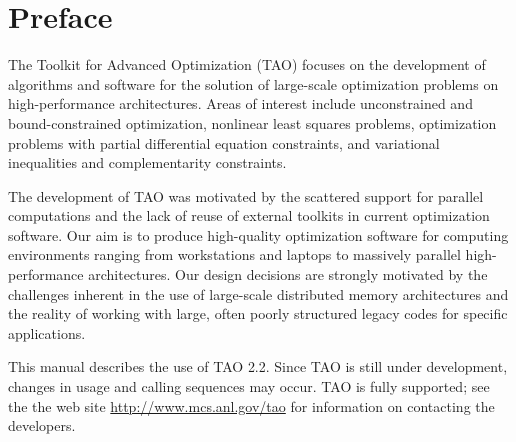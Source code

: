 
\section*{Preface}

The Toolkit for Advanced Optimization (TAO) focuses on the development
of algorithms and software for the solution of large-scale optimization 
problems on high-performance architectures.  Areas of interest include 
unconstrained and bound-constrained optimization, nonlinear least squares 
problems, optimization problems with partial differential equation 
constraints, and variational inequalities and complementarity 
constraints.

The development of TAO was motivated by the scattered support for
parallel computations and the lack of reuse of external toolkits in
current optimization software.  Our aim is to produce high-quality 
optimization software for computing environments ranging from 
workstations and laptops to massively parallel high-performance 
architectures.  Our design decisions are strongly motivated by 
the challenges inherent in the use of large-scale distributed 
memory architectures and the reality of working with large, 
often poorly structured legacy codes for specific 
applications.

This manual describes the use of TAO 2.2.  Since TAO is still under 
development, changes in usage and calling sequences may occur.  TAO 
is fully supported; see the the web site \url{http://www.mcs.anl.gov/tao} 
for information on contacting the developers.


